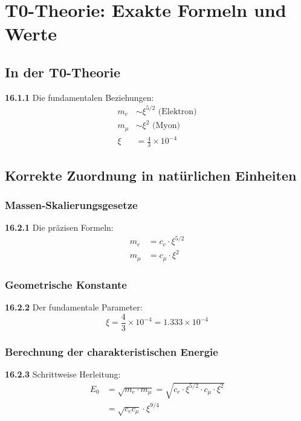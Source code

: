 \documentclass[12pt,a4paper]{article}
\newcommand{\xipar}{\xi}
\begin{document}

\section{T0-Theorie: Exakte Formeln und Werte}

\subsection{In der T0-Theorie}

\noindent \textbf{16.1.1} Die fundamentalen Beziehungen:
\begin{align}
	m_e &\sim \xi^{5/2} \text{ (Elektron)} \\
	m_\mu &\sim \xi^2 \text{ (Myon)} \\
	\xi &= \frac{4}{3} \times 10^{-4} 
\end{align}

\subsection{Korrekte Zuordnung in natürlichen Einheiten}

\subsubsection{Massen-Skalierungsgesetze}
\noindent \textbf{16.2.1} Die präzisen Formeln:
\begin{align}
	m_e &= c_e \cdot \xipar^{5/2} \\
	m_\mu &= c_\mu \cdot \xipar^2
\end{align}

\subsubsection{Geometrische Konstante}
\noindent \textbf{16.2.2} Der fundamentale Parameter:
\begin{equation}
	\xipar = \frac{4}{3} \times 10^{-4} = 1.333 \times 10^{-4}
\end{equation}

\subsubsection{Berechnung der charakteristischen Energie}
\noindent \textbf{16.2.3} Schrittweise Herleitung:
\begin{align}
	E_0 &= \sqrt{m_e \cdot m_\mu} = \sqrt{c_e \cdot \xipar^{5/2} \cdot c_\mu \cdot \xipar^2} \\
	&= \sqrt{c_e c_\mu} \cdot \xipar^{9/4}
\end{align}
\end{document}
